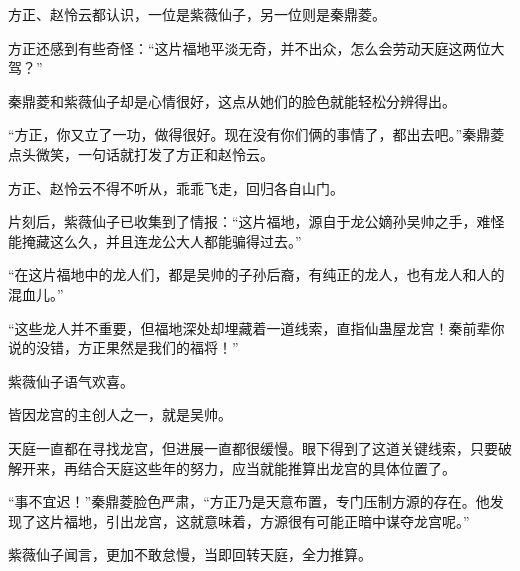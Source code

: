 \begin{this_body}
方正、赵怜云都认识，一位是紫薇仙子，另一位则是秦鼎菱。

方正还感到有些奇怪：“这片福地平淡无奇，并不出众，怎么会劳动天庭这两位大驾？”

秦鼎菱和紫薇仙子却是心情很好，这点从她们的脸色就能轻松分辨得出。

“方正，你又立了一功，做得很好。现在没有你们俩的事情了，都出去吧。”秦鼎菱点头微笑，一句话就打发了方正和赵怜云。

方正、赵怜云不得不听从，乖乖飞走，回归各自山门。

片刻后，紫薇仙子已收集到了情报：“这片福地，源自于龙公嫡孙吴帅之手，难怪能掩藏这么久，并且连龙公大人都能骗得过去。”

“在这片福地中的龙人们，都是吴帅的子孙后裔，有纯正的龙人，也有龙人和人的混血儿。”

“这些龙人并不重要，但福地深处却埋藏着一道线索，直指仙蛊屋龙宫！秦前辈你说的没错，方正果然是我们的福将！”

紫薇仙子语气欢喜。

皆因龙宫的主创人之一，就是吴帅。

天庭一直都在寻找龙宫，但进展一直都很缓慢。眼下得到了这道关键线索，只要破解开来，再结合天庭这些年的努力，应当就能推算出龙宫的具体位置了。

“事不宜迟！”秦鼎菱脸色严肃，“方正乃是天意布置，专门压制方源的存在。他发现了这片福地，引出龙宫，这就意味着，方源很有可能正暗中谋夺龙宫呢。”

紫薇仙子闻言，更加不敢怠慢，当即回转天庭，全力推算。

\end{this_body}

